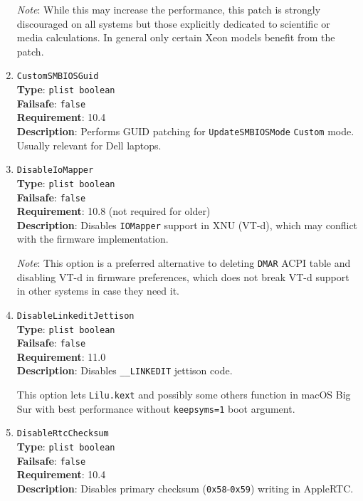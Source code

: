 \documentclass[]{article}
\begin{document}
\begin{enumerate}
  \emph{Note}: While this may increase the performance, this patch is strongly discouraged
  on all systems but those explicitly dedicated to scientific or media calculations.
  In general only certain Xeon models benefit from the patch.

\item
  \texttt{CustomSMBIOSGuid}\\
  \textbf{Type}: \texttt{plist\ boolean}\\
  \textbf{Failsafe}: \texttt{false}\\
  \textbf{Requirement}: 10.4\\
  \textbf{Description}: Performs GUID patching for \texttt{UpdateSMBIOSMode}
  \texttt{Custom} mode. Usually relevant for Dell laptops.

\item
  \texttt{DisableIoMapper}\\
  \textbf{Type}: \texttt{plist\ boolean}\\
  \textbf{Failsafe}: \texttt{false}\\
  \textbf{Requirement}: 10.8 (not required for older)\\
  \textbf{Description}: Disables \texttt{IOMapper} support in XNU (VT-d),
  which may conflict with the firmware implementation.

  \emph{Note}: This option is a preferred alternative to deleting \texttt{DMAR}
  ACPI table and disabling VT-d in firmware preferences, which does not break
  VT-d support in other systems in case they need it.

\item
  \texttt{DisableLinkeditJettison}\\
  \textbf{Type}: \texttt{plist\ boolean}\\
  \textbf{Failsafe}: \texttt{false}\\
  \textbf{Requirement}: 11.0\\
  \textbf{Description}: Disables \texttt{\_\_LINKEDIT} jettison code.

  This option lets \texttt{Lilu.kext} and possibly some others function
  in macOS Big Sur with best performance without \texttt{keepsyms=1}
  boot argument.

\item
  \texttt{DisableRtcChecksum}\\
  \textbf{Type}: \texttt{plist\ boolean}\\
  \textbf{Failsafe}: \texttt{false}\\
  \textbf{Requirement}: 10.4\\
  \textbf{Description}: Disables primary checksum (\texttt{0x58}-\texttt{0x59})
  writing in AppleRTC.


\end{enumerate}
\end{document}
